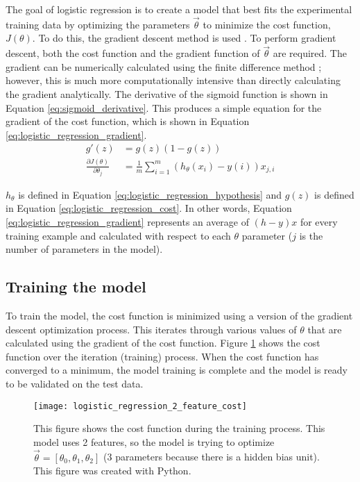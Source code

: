 The goal of logistic regression is to create a model that best fits the experimental training data by optimizing the parameters $\vec{\theta}$ to minimize the cost function, $J(\theta)$.  To do this, the gradient descent method is used \cite{gradient_descent}.  To  perform gradient descent, both the cost function and the gradient function of $\vec{\theta}$ are required.  The gradient can be numerically calculated using the finite difference method \cite{finite_difference_method}; however, this is much more computationally intensive than directly calculating the gradient analytically.  The derivative of the sigmoid function is shown in Equation \ref{eq:sigmoid_derivative}.  This produces a simple equation for the gradient of the cost function, which is shown in Equation \ref{eq:logistic_regression_gradient}.
\begin{align}
	g\prime(z) &= g(z) (1-g(z)) \label{eq:sigmoid_derivative} \\
	\frac{\partial J(\theta)}{\partial \theta_j} &= \frac{1}{m} \sum_{i=1}^{m}{\left(h_{\theta}(x_i) - y(i)\right) x_{j,i}} \label{eq:logistic_regression_gradient}
\end{align}

$h_{\theta}$ is defined in Equation \ref{eq:logistic_regression_hypothesis} and $g(z)$ is defined in Equation \ref{eq:logistic_regression_cost}.  In other words, Equation \ref{eq:logistic_regression_gradient} represents an average of $(h-y)x$ for every training example and calculated with respect to each $\theta$ parameter ($j$ is the number of parameters in the model).

\subsection{Training the model}
To train the model, the cost function is minimized using a version of the gradient descent optimization process.  This iterates through various values of $\theta$ that are calculated using the gradient of the cost function.  Figure \ref{fig:logistic_regression_2_feature_cost} shows the cost function over the iteration (training) process.  When the cost function has converged to a minimum, the model training is complete and the model is ready to be validated on the test data.

\begin{figure}
	\centering
	\texttt{[image: logistic\_regression\_2\_feature\_cost]}
	\decoRule
	\caption{This figure shows the cost function during the training process.  This model uses 2 features, so the model is trying to optimize $\vec{\theta} = [\theta_0, \theta_1, \theta_2]$ (3 parameters because there is a hidden bias unit).  This figure was created with Python.}
	\label{fig:logistic_regression_2_feature_cost}
\end{figure}

